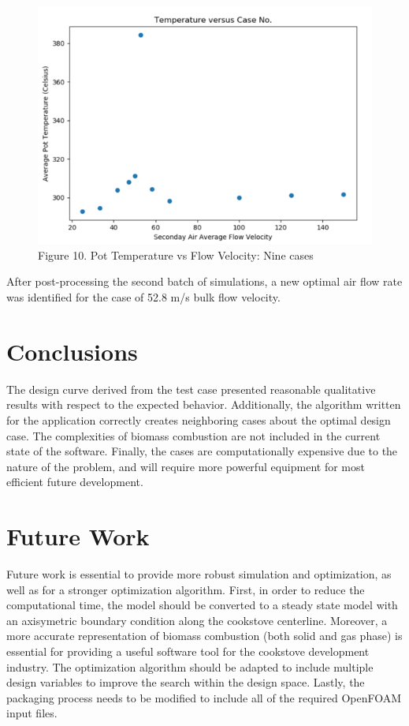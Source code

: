 \documentclass[3p,times,twocolumn]{elsarticle}
\begin{document}
\begin{figure}
	\includegraphics[width=\linewidth]{second.png}
	\caption{Figure 10. Pot Temperature vs Flow Velocity: Nine cases}
\end{figure}


After post-processing the second batch of simulations, a new optimal air flow rate was identified for the case of 52.8 m/s bulk flow velocity.

\section{Conclusions}
The design curve derived from the test case presented reasonable qualitative results with respect to the expected behavior. Additionally, the algorithm written for the application correctly creates neighboring cases about the optimal design case. The complexities of biomass combustion are not included in the current state of the software. Finally, the cases are computationally expensive due to the nature of the problem, and will require more powerful equipment for most efficient future development.


\section{Future Work}
Future work is essential to provide more robust simulation and optimization, as well as for a stronger optimization algorithm. First, in order to reduce the computational time, the model should be converted to a steady state model with an axisymetric boundary condition along the cookstove centerline. Moreover, a more accurate representation of biomass combustion (both solid and gas phase) is essential for providing a useful software tool for the cookstove development industry. The optimization algorithm should be adapted to include multiple design variables to improve the search within the design space. Lastly, the packaging process needs to be modified to include all of the required OpenFOAM input files.
\end{document}
